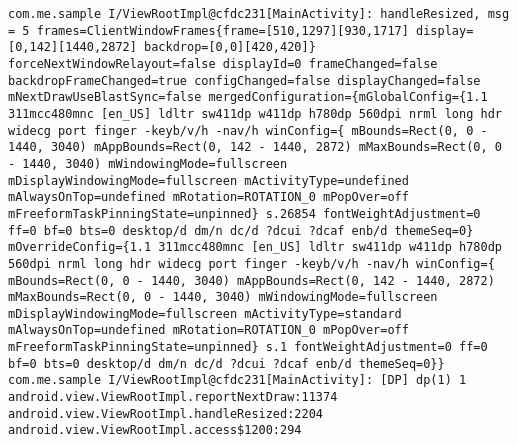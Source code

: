 \documentclass[9pt, b5paper]{article}
\begin{document}
\begin{verbatim}
com.me.sample I/ViewRootImpl@cfdc231[MainActivity]: handleResized, msg = 5 frames=ClientWindowFrames{frame=[510,1297][930,1717] display=[0,142][1440,2872] backdrop=[0,0][420,420]} forceNextWindowRelayout=false displayId=0 frameChanged=false backdropFrameChanged=true configChanged=false displayChanged=false mNextDrawUseBlastSync=false mergedConfiguration={mGlobalConfig={1.1 311mcc480mnc [en_US] ldltr sw411dp w411dp h780dp 560dpi nrml long hdr widecg port finger -keyb/v/h -nav/h winConfig={ mBounds=Rect(0, 0 - 1440, 3040) mAppBounds=Rect(0, 142 - 1440, 2872) mMaxBounds=Rect(0, 0 - 1440, 3040) mWindowingMode=fullscreen mDisplayWindowingMode=fullscreen mActivityType=undefined mAlwaysOnTop=undefined mRotation=ROTATION_0 mPopOver=off mFreeformTaskPinningState=unpinned} s.26854 fontWeightAdjustment=0 ff=0 bf=0 bts=0 desktop/d dm/n dc/d ?dcui ?dcaf enb/d themeSeq=0} mOverrideConfig={1.1 311mcc480mnc [en_US] ldltr sw411dp w411dp h780dp 560dpi nrml long hdr widecg port finger -keyb/v/h -nav/h winConfig={ mBounds=Rect(0, 0 - 1440, 3040) mAppBounds=Rect(0, 142 - 1440, 2872) mMaxBounds=Rect(0, 0 - 1440, 3040) mWindowingMode=fullscreen mDisplayWindowingMode=fullscreen mActivityType=standard mAlwaysOnTop=undefined mRotation=ROTATION_0 mPopOver=off mFreeformTaskPinningState=unpinned} s.1 fontWeightAdjustment=0 ff=0 bf=0 bts=0 desktop/d dm/n dc/d ?dcui ?dcaf enb/d themeSeq=0}}
com.me.sample I/ViewRootImpl@cfdc231[MainActivity]: [DP] dp(1) 1 android.view.ViewRootImpl.reportNextDraw:11374 android.view.ViewRootImpl.handleResized:2204 android.view.ViewRootImpl.access$1200:294
\end{verbatim}
\end{document}
